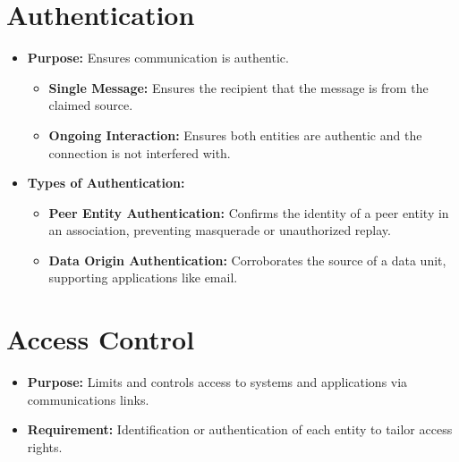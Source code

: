\section{Authentication}
\begin{itemize}
    \item \textbf{Purpose:} Ensures communication is authentic.\label{AuthenticationPurpose}
    \begin{itemize}
        \item \textbf{Single Message:} Ensures the recipient that the message is from the claimed source.\label{SingleMessage}
        \item \textbf{Ongoing Interaction:} Ensures both entities are authentic and the connection is not interfered with.\label{OngoingInteraction}
    \end{itemize}
    \item \textbf{Types of Authentication:}
    \begin{itemize}
        \item \textbf{Peer Entity Authentication:} Confirms the identity of a peer entity in an association, preventing masquerade or unauthorized replay.\label{PeerEntityAuthentication}
        \item \textbf{Data Origin Authentication:} Corroborates the source of a data unit, supporting applications like email.\label{DataOriginAuthentication}
    \end{itemize}
\end{itemize}

\section{Access Control}
\begin{itemize}
    \item \textbf{Purpose:} Limits and controls access to systems and applications via communications links.\label{AccessControlPurpose}
    \item \textbf{Requirement:} Identification or authentication of each entity to tailor access rights.\label{AccessControlRequirement}
\end{itemize}

